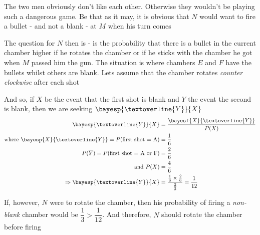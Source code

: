 \begin{solution}
	The two men obviously don't like each other. Otherwise they wouldn't be playing such 
	a dangerous game. Be that as it may, it is obvious that $N$ would want to fire a bullet - and not a 
	blank - at $M$ when his turn comes
	
	The question for $N$ then is - is the probability that there is a bullet in the current
	chamber higher if he rotates the chamber or if he sticks with the chamber he got when $M$
	passed him the gun. The situation is \asif where chambers $E$ and $F$ have the bullets whilst 
	others are blank. Lets assume that the chamber rotates \textit{counter clockwise} after each shot
	
	And so, if $X$ be the event that the first shot is blank and $Y$ the event the second
	is blank, then we are seeking $\bayesp{\textoverline{Y}}{X}$
	\begin{align}
		\bayesp{\textoverline{Y}}{X} &= \dfrac{\bayesf{X}{\textoverline{Y}}}{P(X)} \\
		\text{where }\bayesp{X}{\textoverline{Y}} = P(\text{first shot = A}) &= \dfrac{1}{6} \\
		P(\overline{Y}) = P(\text{first shot = A or F}) &= \dfrac{2}{6} \\
		\text{and } P(X) &= \dfrac{4}{6} \\
		\Rightarrow \bayesp{\textoverline{Y}}{X} &= \dfrac{\frac{1}{6}\times\frac{2}{6}}{\frac{2}{3}} = \dfrac{1}{12}
	\end{align}
	
	If, however, $N$ were to rotate the chamber, then his probability of firing a \textit{non-blank} 
	chamber would be $\dfrac{1}{3} > \dfrac{1}{12}$. And therefore, $N$ should rotate the chamber before firing
	
\end{solution}
